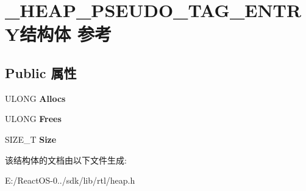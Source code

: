 \hypertarget{struct___h_e_a_p___p_s_e_u_d_o___t_a_g___e_n_t_r_y}{}\section{\+\_\+\+H\+E\+A\+P\+\_\+\+P\+S\+E\+U\+D\+O\+\_\+\+T\+A\+G\+\_\+\+E\+N\+T\+R\+Y结构体 参考}
\label{struct___h_e_a_p___p_s_e_u_d_o___t_a_g___e_n_t_r_y}
\subsection*{Public 属性}
\begin{DoxyCompactItemize}
\item 
\mbox{\label{struct___h_e_a_p___p_s_e_u_d_o___t_a_g___e_n_t_r_y_ab2969f5e8b4c91920fcb708735b8703d}} 
U\+L\+O\+NG {\bfseries Allocs}
\item 
\mbox{\label{struct___h_e_a_p___p_s_e_u_d_o___t_a_g___e_n_t_r_y_ab74f411e2af3b19f3f51501bb62e7aa1}} 
U\+L\+O\+NG {\bfseries Frees}
\item 
\mbox{\label{struct___h_e_a_p___p_s_e_u_d_o___t_a_g___e_n_t_r_y_ad1c2f184720bc9297546d13cf5945954}} 
S\+I\+Z\+E\+\_\+T {\bfseries Size}
\end{DoxyCompactItemize}


该结构体的文档由以下文件生成\+:\begin{DoxyCompactItemize}
\item 
E\+:/\+React\+O\+S-\/0../sdk/lib/rtl/heap.\+h\end{DoxyCompactItemize}
